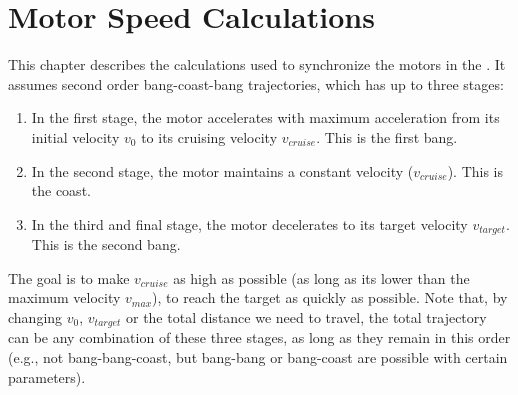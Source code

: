 \chapter{Motor Speed Calculations}
\label{chap:MSC}
This chapter describes the calculations used to synchronize the motors in the \Product{}. It assumes second order bang-coast-bang trajectories, which has up to three stages:
\begin{enumerate}
    \item In the first stage, the motor accelerates with maximum acceleration from its initial velocity $v_0$ to its cruising velocity $v_{cruise}$. This is the first bang.
    \item In the second stage, the motor maintains a constant velocity ($v_{cruise}$). This is the coast.
    \item In the third and final stage, the motor decelerates to its target velocity $v_{target}$. This is the second bang.
\end{enumerate}

\noindent The goal is to make $v_{cruise}$ as high as possible (as long as its lower than the maximum velocity $v_{max}$), to reach the target as quickly as possible. Note that, by changing $v_0$, $v_{target}$ or the total distance we need to travel, the total trajectory can be any combination of these three stages, as long as they remain in this order (e.g., not bang-bang-coast, but bang-bang or bang-coast are possible with certain parameters).


